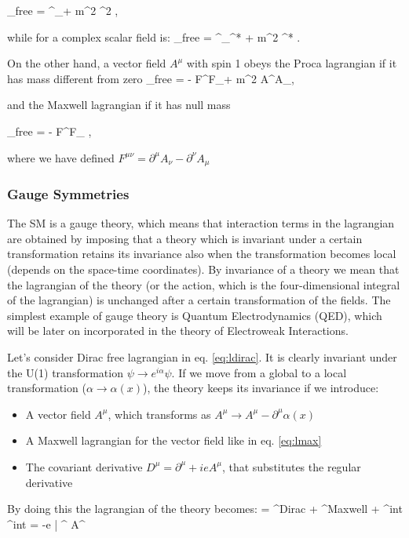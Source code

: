 \beq
{}_{free} =  \partial^\mu \phi \partial_\mu \phi +  m^2 \phi ^2 ,
\eeq
 
while for a complex scalar field is:
\beq
{}_{free} =  \partial^\mu \phi \partial_\mu \phi^* +  m^2 \phi \phi^* .
\eeq

On the other hand, a vector field $A^\mu$ with spin 1 obeys the Proca lagrangian if it has mass different from zero
\beq
{}_{free} =  -  F^{\mu \nu}F_{\mu \nu}+   m^2 A^\mu A_\mu ,
\label{eq:lproca}
\eeq

and the Maxwell lagrangian if it has null mass

\beq
{}_{free} =  -  F^{\mu \nu}F_{\mu \nu} ,
\label{eq:lmax}
\eeq

where we have defined $F^{\mu \nu} = \partial^\mu A_\nu - \partial^\nu A_\mu$

\subsubsection{Gauge Symmetries}

The SM is a gauge theory, which means that interaction terms in the lagrangian are obtained by imposing that a theory which is invariant under a certain transformation retains its invariance also when the transformation becomes local (depends on the space-time coordinates). By invariance of a theory we mean that the lagrangian of the theory (or the action, which is the four-dimensional integral of the lagrangian) is unchanged after a certain transformation of the fields. The simplest example of gauge theory is Quantum Electrodynamics (QED), which will be later on incorporated in the theory of Electroweak Interactions. 

Let's consider Dirac free lagrangian in eq. \ref{eq:ldirac}. It is clearly invariant under the U(1) transformation $\psi \rightarrow e^{i \alpha} \psi$. If we move from a global to a local transformation ($\alpha \rightarrow \alpha (x) $), the theory keeps its invariance if we introduce:
\begin{itemize}
\item A vector field $A^\mu$, which transforms as $A^\mu \rightarrow A^\mu - \partial^\mu \alpha (x)$
\item A Maxwell lagrangian for the vector field like in eq. \ref{eq:lmax}
\item The covariant derivative $D^\mu = \partial^\mu + ieA^\mu$, that substitutes the regular derivative
\end{itemize}
By doing this the lagrangian of the theory becomes:
\beq
{} = ^{Dirac} + ^{Maxwell} + ^{int} \quad \quad \quad {}^{int} = -e \bar{\psi} \gamma^{\mu} \psi A^\mu 
\label{eq:lqed}
\eeq

